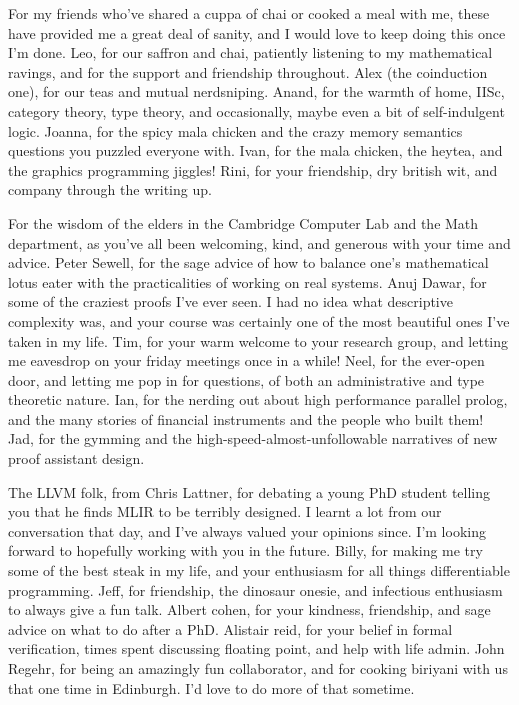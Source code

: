 For my friends who've shared a cuppa of chai or cooked a meal with me,
these have provided me a great deal of sanity, and I would love to keep doing this once I'm done.
Leo, for our saffron and chai, patiently listening to my mathematical ravings,
and for the support and friendship throughout.
Alex (the coinduction one), for our teas and mutual nerdsniping.
Anand, for the warmth of home, IISc, category theory, type theory,
and occasionally, maybe even a bit of self-indulgent logic.
Joanna, for the spicy mala chicken and the crazy memory semantics questions you puzzled everyone with.
Ivan, for the mala chicken, the heytea, and the graphics programming jiggles!
Rini, for your friendship, dry british wit, and company through the writing up.

For the wisdom of the elders in the Cambridge Computer Lab and the Math department,
as you've all been welcoming, kind, and generous with your time and advice.
Peter Sewell, for the sage advice of how to balance one's mathematical lotus eater with the practicalities of working on real systems.
Anuj Dawar, for some of the craziest proofs I've ever seen. I had no idea what descriptive complexity was,
and your course was certainly one of the most beautiful ones I've taken in my life.
Tim, for your warm welcome to your research group, and letting me eavesdrop on your friday meetings once in a while!
Neel, for the ever-open door, and letting me pop in for questions, of both an administrative and type theoretic nature.
Ian, for the nerding out about high performance parallel prolog, and the many stories of financial instruments and the people who built them!
Jad, for the gymming and the high-speed-almost-unfollowable narratives of new proof assistant design.

The LLVM folk, from Chris Lattner, for debating a young PhD student telling you that he finds MLIR to be terribly designed.
I learnt a lot from our conversation that day, and I've always valued your opinions since.
I'm looking forward to hopefully working with you in the future.
Billy, for making me try some of the best steak in my life, and your enthusiasm for all things differentiable programming.
Jeff, for friendship, the dinosaur onesie, and infectious enthusiasm to always give a fun talk.
Albert cohen, for your kindness, friendship, and sage advice on what to do after a PhD.
Alistair reid, for your belief in formal verification, times spent discussing floating point, and help with life admin.
John Regehr, for being an amazingly fun collaborator, and for cooking biriyani with us that one time in Edinburgh.
I'd love to do more of that sometime.

